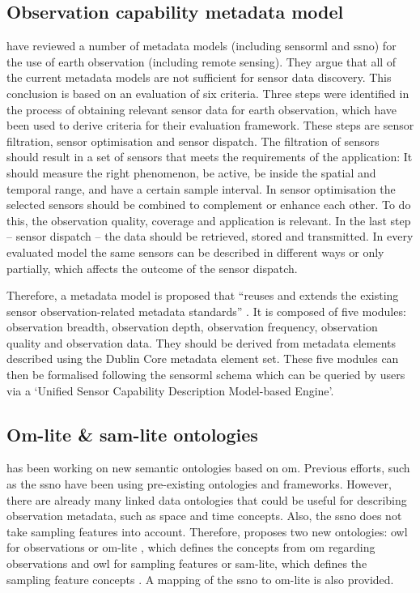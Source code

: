 \subsection{Observation capability metadata model} 
\cite{SW:Hu} have reviewed a number of metadata models (including \ac{sensorml} and \ac{ssno}) for the use of earth observation (including remote sensing). They argue that all of the current metadata models are not sufficient for sensor data discovery. This conclusion is based on an evaluation of six criteria. Three steps were identified in the process of obtaining relevant sensor data for earth observation, which have been used to derive criteria for their evaluation framework. These steps are sensor filtration, sensor optimisation and sensor dispatch. The filtration of sensors should result in a set of sensors that meets the requirements of the application: It should measure the right phenomenon, be active, be inside the spatial and temporal range, and have a certain sample interval. In sensor optimisation the selected sensors should be combined to complement or enhance each other. To do this, the observation quality, coverage and application is relevant. In the last step -- sensor dispatch -- the data should be retrieved, stored and transmitted. In every evaluated model the same sensors can be described in different ways or only partially, which affects the outcome of the sensor dispatch. 

Therefore, a metadata model is proposed that \enquote{reuses and extends the existing sensor observation-related metadata standards} \cite[p. 10546]{SW:Hu}. It is composed of five modules: observation breadth, observation depth, observation frequency, observation quality and observation data. They should be derived from metadata elements described using the Dublin Core metadata element set. These five modules can then be formalised following the \ac{sensorml} schema which can be queried by users via a `Unified Sensor Capability Description Model-based Engine'. 

\subsection{Om-lite \& sam-lite ontologies}
\cite{SSW:Cox4} has been working on new semantic ontologies based on \ac{om}. Previous efforts, such as the \ac{ssno} have been using pre-existing ontologies and frameworks. However, there are already many linked data ontologies that could be useful for describing observation metadata, such as space and time concepts. Also, the \ac{ssno} does not take sampling features into account. Therefore, \cite{SSW:Cox4} proposes two new ontologies: \ac{owl} for observations or om-lite \citep{SSW:Cox3}, which defines the concepts from \ac{om} regarding observations and \ac{owl} for sampling features or sam-lite, which defines the sampling feature concepts \citep{SSW:Cox2}. A mapping of the \ac{ssno} to om-lite is also provided.

